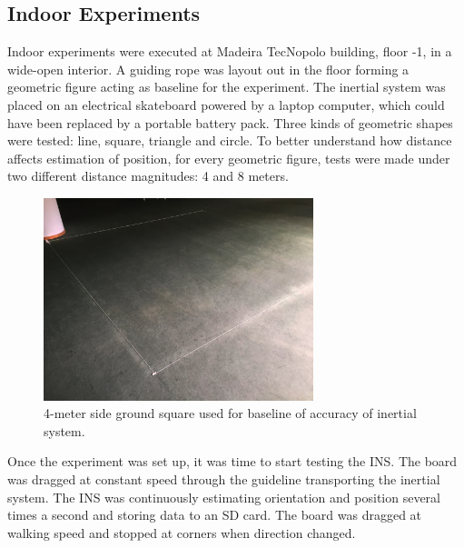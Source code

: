 \subsection{Indoor Experiments}

Indoor experiments were executed at Madeira TecNopolo building, floor -1, in a wide-open interior. A guiding rope was layout out in the floor forming a geometric figure acting as baseline for the experiment. The inertial system was placed on an electrical skateboard powered by a laptop computer, which could have been replaced by a portable battery pack. Three kinds of geometric shapes were tested: line, square, triangle and circle. To better understand how distance affects estimation of position, for every geometric figure, tests were made under two different distance magnitudes: 4 and 8 meters.

\begin{figure}[!h]
  \centering
  \includegraphics[width=0.7\textwidth]{figures/indoor.jpg}
  \caption{4-meter side ground square used for baseline of accuracy of inertial system.}
  \label{fig:indoor_square}
\end{figure}

Once the experiment was set up, it was time to start testing the INS. The board was dragged at constant speed through the guideline transporting the inertial system. The INS was continuously estimating orientation and position several times a second and storing data to an SD card. The board was dragged at walking speed and stopped at corners when direction changed.

